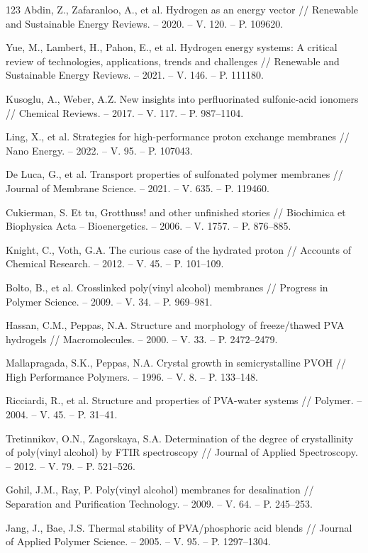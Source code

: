 \documentclass[12pt,a4paper]{report}
\begin{document}
\begin{thebibliography}{123}
 Abdin, Z., Zafaranloo, A., et al. Hydrogen as an energy vector // Renewable and Sustainable Energy Reviews. – 2020. – V. 120. – P. 109620.

 Yue, M., Lambert, H., Pahon, E., et al. Hydrogen energy systems: A critical review of technologies, applications, trends and challenges // Renewable and Sustainable Energy Reviews. – 2021. – V. 146. – P. 111180.

 Kusoglu, A., Weber, A.Z. New insights into perfluorinated sulfonic-acid ionomers // Chemical Reviews. – 2017. – V. 117. – P. 987–1104.

 Ling, X., et al. Strategies for high-performance proton exchange membranes // Nano Energy. – 2022. – V. 95. – P. 107043.

 De Luca, G., et al. Transport properties of sulfonated polymer membranes // Journal of Membrane Science. – 2021. – V. 635. – P. 119460.

 Cukierman, S. Et tu, Grotthuss! and other unfinished stories // Biochimica et Biophysica Acta – Bioenergetics. – 2006. – V. 1757. – P. 876–885.

 Knight, C., Voth, G.A. The curious case of the hydrated proton // Accounts of Chemical Research. – 2012. – V. 45. – P. 101–109.

 Bolto, B., et al. Crosslinked poly(vinyl alcohol) membranes // Progress in Polymer Science. – 2009. – V. 34. – P. 969–981.

 Hassan, C.M., Peppas, N.A. Structure and morphology of freeze/thawed PVA hydrogels // Macromolecules. – 2000. – V. 33. – P. 2472–2479.

 Mallapragada, S.K., Peppas, N.A. Crystal growth in semicrystalline PVOH // High Performance Polymers. – 1996. – V. 8. – P. 133–148.

 Ricciardi, R., et al. Structure and properties of PVA-water systems // Polymer. – 2004. – V. 45. – P. 31–41.

 Tretinnikov, O.N., Zagorskaya, S.A. Determination of the degree of crystallinity of poly(vinyl alcohol) by FTIR spectroscopy // Journal of Applied Spectroscopy. – 2012. – V. 79. – P. 521–526.

 Gohil, J.M., Ray, P. Poly(vinyl alcohol) membranes for desalination // Separation and Purification Technology. – 2009. – V. 64. – P. 245–253.

 Jang, J., Bae, J.S. Thermal stability of PVA/phosphoric acid blends // Journal of Applied Polymer Science. – 2005. – V. 95. – P. 1297–1304.


\end{thebibliography}
\end{document}
